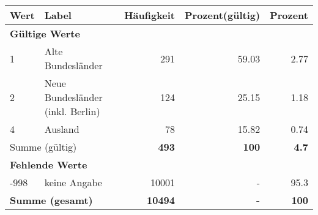      \begin{longtable}{lXrrr}
     \toprule
     \textbf{Wert} & \textbf{Label} & \textbf{Häufigkeit} & \textbf{Prozent(gültig)} & \textbf{Prozent} \\
     \endhead
     \midrule
     \multicolumn{5}{l}{\textbf{Gültige Werte}}\\

     1 &
     \multicolumn{1}{X}{ Alte Bundesländer   } &


       \num{291} &
       \num[round-mode=places,round-precision=2]{59,03} &
         \num[round-mode=places,round-precision=2]{2,77} \\

     2 &
     \multicolumn{1}{X}{ Neue Bundesländer (inkl. Berlin)   } &


       \num{124} &
       \num[round-mode=places,round-precision=2]{25,15} &
         \num[round-mode=places,round-precision=2]{1,18} \\

     4 &
     \multicolumn{1}{X}{ Ausland   } &


       \num{78} &
       \num[round-mode=places,round-precision=2]{15,82} &
         \num[round-mode=places,round-precision=2]{0,74} \\
     \midrule
     \multicolumn{2}{l}{Summe (gültig)} &
       \textbf{\num{493}} &
     \textbf{100} &
       \textbf{\num[round-mode=places,round-precision=2]{4,7}} \\
     \multicolumn{5}{l}{\textbf{Fehlende Werte}}\\
       -998 &
       keine Angabe &
         \num{10001} &
        - &
         \num[round-mode=places,round-precision=2]{95,3} \\
     \midrule
     \multicolumn{2}{l}{\textbf{Summe (gesamt)}} &
          \textbf{\num{10494}} &
        \textbf{-} &
        \textbf{100} \\
     \bottomrule
     \end{longtable}
     
